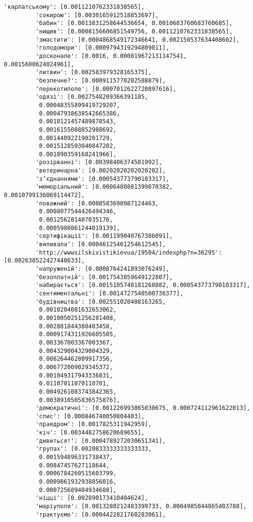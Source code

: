 \documentclass[11pt]{article}
\begin{document}
\begin{Verbatim}[commandchars=\\\{\}]
         'карпатському': [0.0011210762331838565],
         'сокирою': [0.0030165912518853697],
         'бабин': [0.0013831258644536654, 0.0010683760683760685],
         'нищив': [0.0008156606851549756, 0.0011210762331838565],
         'змастити': [0.0004868549172346641, 0.002150537634408602],
         'голодомори': [0.0009794319294809011],
         'досконале': [0.0016, 0.000819672131147541, 0.0015600624024961],
         'литвин': [0.002583979328165375],
         'безпечне?': [0.0009115770282588879],
         'перекотиполе': [0.0007012622720897616],
         'одязі': [0.0027548209366391185,
          0.00048355899419729207,
          0.00047938638542665386,
          0.0010121457489878543,
          0.0016155088852988692,
          0.001440922190201729,
          0.0015128593040847202,
          0.001890359168241966],
         'розірванні': [0.00398406374501992],
         'ветеринарна': [0.00202020202020202],
         'з’єднаннями': [0.000543773790103317],
         'меморіальний': [0.0006480881399870382, 0.0010799136069114472],
         'поважний': [0.0008583690987124463,
          0.0008077544426494346,
          0.001256281407035176,
          0.0005980861244019139],
         'сертифікації': [0.001199040767386091],
         'виливала': [0.00046125461254612545],
         'http://wwwsilskivistikievua/19504/indexphp?n=36295': [0.002638522427440633],
         'напруженій': [0.0008764241893076249],
         'безоплатній': [0.0017543859649122807],
         'набирається': [0.0015105740181268882, 0.000543773790103317],
         'сентиментальні': [0.0014727540500736377],
         'будівництва': [0.002551020408163265,
          0.0010204081632653062,
          0.0010050251256281408,
          0.002881844380403458,
          0.0009174311926605505,
          0.003367003367003367,
          0.004329004329004329,
          0.008264462809917356,
          0.006772009029345372,
          0.001049317943336831,
          0.01107011070110701,
          0.0049261083743842365,
          0.0038910505836575876],
         'демократичні': [0.001226993865030675, 0.000724112961622013],
         'спис': [0.000846740050804403],
         'праядром': [0.0017825311942959],
         'кіч': [0.0034482758620689655],
         'дивиться!': [0.0004789272030651341],
         'групах': [0.0020833333333333333,
          0.001594896331738437,
          0.00847457627118644,
          0.0006784260515603799,
          0.0009861932938856016,
          0.000725689404934688],
         'ніцці': [0.002890173410404624],
         'маріуполя': [0.0013280212483399733, 0.0004985044865403788],
         'трактуємо': [0.0004422821760283061],

\end{Verbatim}
\end{document}
